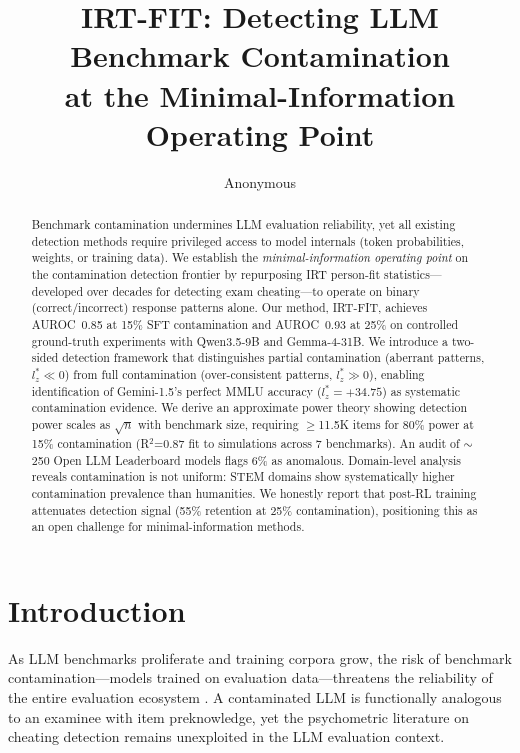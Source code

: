 \documentclass[11pt,a4paper]{article}
\title{IRT-FIT: Detecting LLM Benchmark Contamination\\at the Minimal-Information Operating Point}
\author{Anonymous}
\date{}
\begin{document}
\maketitle

\begin{abstract}
Benchmark contamination undermines LLM evaluation reliability, yet all existing detection methods require privileged access to model internals (token probabilities, weights, or training data). We establish the \emph{minimal-information operating point} on the contamination detection frontier by repurposing IRT person-fit statistics---developed over decades for detecting exam cheating---to operate on binary (correct/incorrect) response patterns alone. Our method, IRT-FIT, achieves AUROC~0.85 at 15\% SFT contamination and AUROC~0.93 at 25\% on controlled ground-truth experiments with Qwen3.5-9B and Gemma-4-31B. We introduce a two-sided detection framework that distinguishes partial contamination (aberrant patterns, $l_z^* \ll 0$) from full contamination (over-consistent patterns, $l_z^* \gg 0$), enabling identification of Gemini-1.5's perfect MMLU accuracy ($l_z^*{=}+34.75$) as systematic contamination evidence. We derive an approximate power theory showing detection power scales as $\sqrt{n}$ with benchmark size, requiring $\geq$11.5K items for 80\% power at 15\% contamination (R$^2$=0.87 fit to simulations across 7 benchmarks). An audit of ${\sim}$250 Open LLM Leaderboard models flags 6\% as anomalous. Domain-level analysis reveals contamination is not uniform: STEM domains show systematically higher contamination prevalence than humanities. We honestly report that post-RL training attenuates detection signal (55\% retention at 25\% contamination), positioning this as an open challenge for minimal-information methods.
\end{abstract}

\section{Introduction}

As LLM benchmarks proliferate and training corpora grow, the risk of benchmark contamination---models trained on evaluation data---threatens the reliability of the entire evaluation ecosystem \citep{sainz2023nlp,jacovi2023stop}. A contaminated LLM is functionally analogous to an examinee with item preknowledge, yet the psychometric literature on cheating detection remains unexploited in the LLM evaluation context.
\end{document}
